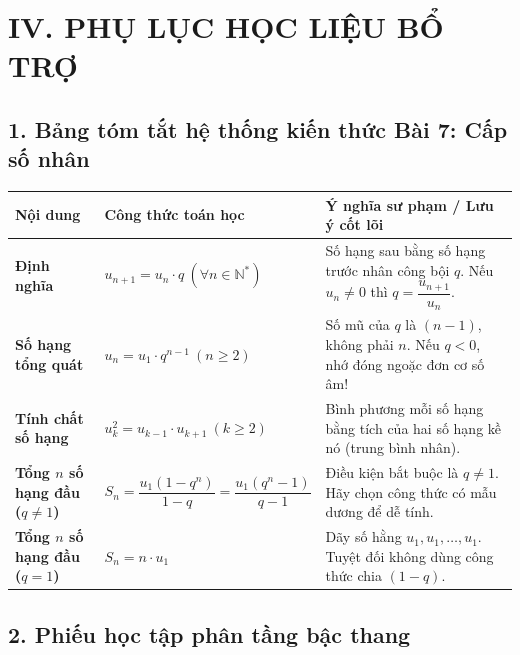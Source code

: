 \documentclass[12pt, a4paper]{article}
\begin{document}
\section*{IV. PHỤ LỤC HỌC LIỆU BỔ TRỢ}

\subsection*{1. Bảng tóm tắt hệ thống kiến thức Bài 7: Cấp số nhân}

\begin{center}
\small
\begin{tabularx}{\textwidth}{|p{3.5cm}|X|X|}
\hline
\textbf{Nội dung} & \textbf{Công thức toán học} & \textbf{Ý nghĩa sư phạm / Lưu ý cốt lõi} \\ \hline
\textbf{Định nghĩa} & $u_{n+1} = u_n \cdot q \ (\forall n \in \mathbb{N}^*)$ & Số hạng sau bằng số hạng trước nhân công bội $q$. Nếu $u_n \neq 0$ thì $q = \dfrac{u_{n+1}}{u_n}$. \\ \hline
\textbf{Số hạng tổng quát} & $u_n = u_1 \cdot q^{n-1} \ (n \ge 2)$ & Số mũ của $q$ là $(n - 1)$, không phải $n$. Nếu $q < 0$, nhớ đóng ngoặc đơn cơ số âm! \\ \hline
\textbf{Tính chất số hạng} & $u_k^2 = u_{k-1} \cdot u_{k+1} \ (k \ge 2)$ & Bình phương mỗi số hạng bằng tích của hai số hạng kề nó (trung bình nhân). \\ \hline
\textbf{Tổng $n$ số hạng đầu ($q \neq 1$)} & $S_n = \dfrac{u_1(1 - q^n)}{1 - q} = \dfrac{u_1(q^n - 1)}{q - 1}$ & Điều kiện bắt buộc là $q \neq 1$. Hãy chọn công thức có mẫu dương để dễ tính. \\ \hline
\textbf{Tổng $n$ số hạng đầu ($q = 1$)} & $S_n = n \cdot u_1$ & Dãy số hằng $u_1, u_1, \dots, u_1$. Tuyệt đối không dùng công thức chia $(1 - q)$. \\ \hline
\end{tabularx}
\end{center}

\subsection*{2. Phiếu học tập phân tầng bậc thang}
\end{document}
